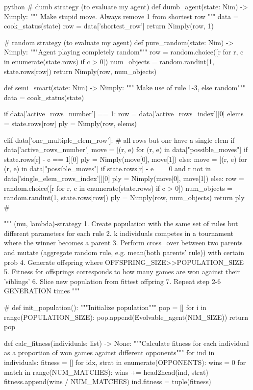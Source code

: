 \begin{mintedbox}{python}
# dumb strategy (to evaluate my agent)
def dumb_agent(state: Nim) -> Nimply:
    """
    Make stupid move. Always remove 1 from shortest row
    """
    data = cook_status(state)
    row = data['shortest_row']
    return Nimply(row, 1)


# random strategy (to evaluate my agent)
def pure_random(state: Nim) -> Nimply:
    """Agent playing completely random"""
    row = random.choice([r for r, c in enumerate(state.rows) if c > 0])
    num_objects = random.randint(1, state.rows[row])
    return Nimply(row, num_objects)


def semi_smart(state: Nim) -> Nimply:
    """ Make use of rule 1-3, else random"""
    data = cook_status(state)

    if data['active_rows_number'] == 1:
        row = data['active_rows_index'][0]
        elems = state.rows[row]
        ply = Nimply(row, elems)

    elif data['one_multiple_elem_row']:  # all rows but one have a single elem
        if data['active_rows_number'] %
            move = [(r, e) for (r, e) in data["possible_moves"] if state.rows[r] - e == 1][0]
            ply = Nimply(move[0], move[1])
        else:
            move = [(r, e) for (r, e) in data["possible_moves"] if
                    state.rows[r] - e == 0 and r not in data['single_elem_rows_index']][0]
            ply = Nimply(move[0], move[1])
    else:
        row = random.choice([r for r, c in enumerate(state.rows) if c > 0])
        num_objects = random.randint(1, state.rows[row])
        ply = Nimply(row, num_objects)
    return ply
# %

"""
(mu, lambda)-strategy
    1. Create population with the same set of rules but different parameters for each rule
    2. k individuals competes in a tournament where the winner becomes a parent
    3. Perform cross_over between two parents and mutate (aggregate random rule, e.g. mean(both parents' rule)) with certain prob
    4. Generate offspring where OFFSPRING_SIZE>>POPULATION_SIZE
    5. Fitness for offsprings corresponds to how many games are won against their 'siblings'
    6. Slice new population from fittest offpring
    7. Repeat step 2-6 GENERATION times
"""

# %
def init_population():
    """Initialize population"""
    pop = []
    for i in range(POPULATION_SIZE):
        pop.append(Evolvable_agent(NIM_SIZE))
    return pop


def calc_fitness(individuals: list) -> None:
    """Calculate fitness for each individual as a proportion of won games against different opponents"""
    for ind in individuals:
        fitness = []
        for idx, strat in enumerate(OPPONENTS):
            wins = 0
            for match in range(NUM_MATCHES):
                wins += head2head(ind, strat)
            fitness.append(wins / NUM_MATCHES)
        ind.fitness = tuple(fitness)



\end{mintedbox}
